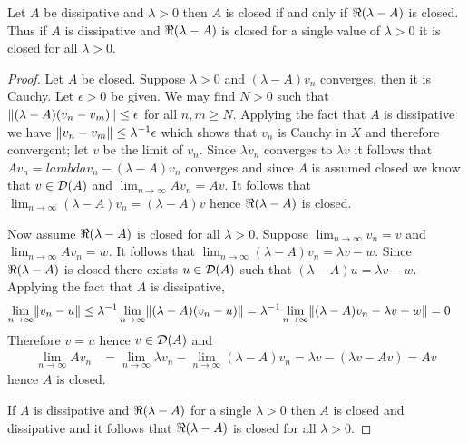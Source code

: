 \begin{prop}\label{DissipativeAndClosed}Let $A$ be dissipative and $\lambda > 0$ then $A$ is closed if and only if $\Re(\lambda - A)$ is closed.  Thus if $A$ is dissipative and $\Re(\lambda - A)$ is closed for a single value of $\lambda > 0$ it is closed for all $\lambda > 0$.
\end{prop}
\begin{proof}
Let $A$ be closed.  Suppose $\lambda>0$ and $(\lambda -A) v_n$ converges, then it is Cauchy.  Let $\epsilon > 0$ be given.  We may find $N > 0$ such that $\lVert (\lambda -A)(v_n-v_m) \rVert \leq \epsilon$ for all $n,m \geq N$.  Applying the fact that $A$ is dissipative we have $\lVert v_n - v_m \rVert \leq \lambda^{-1} \epsilon$ which shows that $v_n$ is Cauchy in $X$ and therefore convergent; let $v$ be the limit of $v_n$.  Since $\lambda v_n$ converges to $\lambda v$ it follows that $A v_n = lambda v_n - (\lambda -A) v_n$ converges and since $A$
is assumed closed we know that $v \in \mathcal{D}(A)$ and $\lim_{n \to \infty} A v_n = A v$.  It follows that $\lim_{n \to \infty} (\lambda -A)v_n  = (\lambda -A)v$ hence $\Re(\lambda - A)$ is closed.

Now assume $\Re(\lambda - A)$ is closed for all $\lambda > 0$.  Suppose $\lim_{n \to \infty} v_n = v$ and $\lim_{n \to \infty} A v_n = w$.  It follows that $\lim_{n \to \infty} (\lambda - A) v_n = \lambda v - w$.  Since $\Re(\lambda - A)$ is closed there exists $u \in \mathcal{D}(A)$ such that $(\lambda - A) u = \lambda v - w$.  Applying the fact that $A$ is dissipative,
\begin{align*}
\lim_{n \to \infty} \lVert v_n - u \rVert &\leq \lambda^{-1}\lim_{n \to \infty} \lVert (\lambda - A)(v_n - u) \rVert = \lambda^{-1}\lim_{n \to \infty} \lVert (\lambda - A)v_n - \lambda v + w \rVert = 0
\end{align*}
Therefore $v = u$ hence $v \in \mathcal{D}(A)$ and 
\begin{align*}
\lim_{n \to \infty} A v_n &= \lim_{n \to \infty} \lambda v_n - \lim_{n \to \infty} (\lambda -A) v_n = \lambda v - (\lambda v - A v) = Av
\end{align*}
hence $A$ is closed.

If $A$ is dissipative and $\Re(\lambda - A)$ for a single $\lambda>0$ then $A$ is closed and dissipative and it follows that $\Re(\lambda - A)$ is closed for all $\lambda > 0$.
\end{proof}


